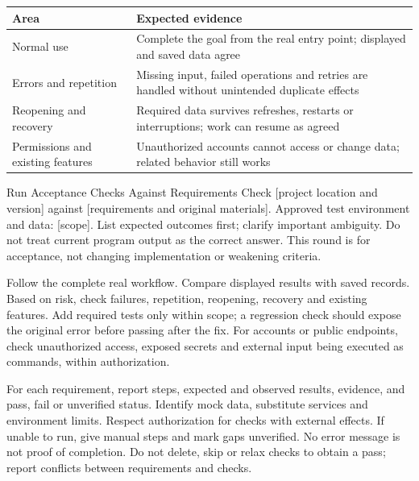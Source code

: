 \begin{tabularx}{\linewidth}{@{}L{38mm}Y@{}}
\toprule Area & Expected evidence\\\midrule
Normal use & Complete the goal from the real entry point; displayed and saved data agree\\
Errors and repetition & Missing input, failed operations and retries are handled without unintended duplicate effects\\
Reopening and recovery & Required data survives refreshes, restarts or interruptions; work can resume as agreed\\
Permissions and existing features & Unauthorized accounts cannot access or change data; related behavior still works\\
\bottomrule\end{tabularx}
\begin{prompt}{Run Acceptance Checks Against Requirements}
Check [project location and version] against [requirements and original materials]. Approved test environment and data: [scope]. List expected outcomes first; clarify important ambiguity. Do not treat current program output as the correct answer. This round is for acceptance, not changing implementation or weakening criteria.\par
Follow the complete real workflow. Compare displayed results with saved records. Based on risk, check failures, repetition, reopening, recovery and existing features. Add required tests only within scope; a regression check should expose the original error before passing after the fix. For accounts or public endpoints, check unauthorized access, exposed secrets and external input being executed as commands, within authorization.\par
For each requirement, report steps, expected and observed results, evidence, and pass, fail or unverified status. Identify mock data, substitute services and environment limits. Respect authorization for checks with external effects. If unable to run, give manual steps and mark gaps unverified. No error message is not proof of completion. Do not delete, skip or relax checks to obtain a pass; report conflicts between requirements and checks.
\end{prompt}
